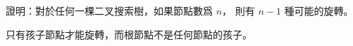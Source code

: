\startEXERCISE
證明：對於任何一棵二叉搜索樹，如果節點數爲 $n$，
則有 $n-1$ 種可能的旋轉。
\stopEXERCISE

\startANSWER
只有孩子節點才能旋轉，而根節點不是任何節點的孩子。
\stopANSWER
